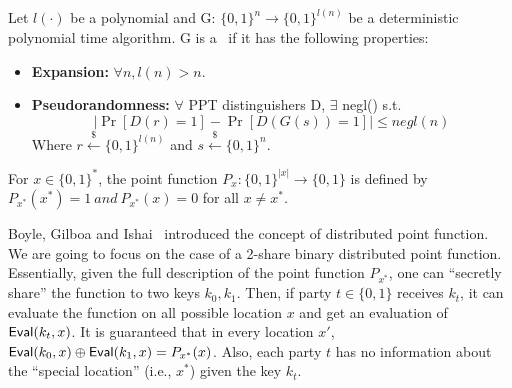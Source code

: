 \begin{definition}[PRG]
    Let $l(\cdot)$ be a polynomial and G: $ \{0,1\}^n \rightarrow \{0,1\}^{l(n)}$ be a deterministic
    polynomial time algorithm. G is a \Prg \ if it has the following properties:
    \hfill
    \begin{itemize}
        \item \textbf{Expansion:} $\forall n, l(n) > n$.
        \item \textbf{Pseudorandomness:} $\forall$ PPT distinguishers D, $\exists$ negl() s.t.
        $$\left|\Pr[D(r) = 1] - \Pr[D(G(s)) = 1]\right| \leq negl(n)$$ 
        Where $r \overset{{\scriptscriptstyle\$}}{\leftarrow} \{0,1\}^{l(n)}$ and
        $s \overset{{\scriptscriptstyle\$}}{\leftarrow} \{0,1\}^{n}$.
    \end{itemize}
\end{definition}


\begin{notation}
    For $x \in\{0,1\}^*$, the point function $P_{x}:\{0,1\}^{|{x}|} \rightarrow \{0,1\}$
    is defined by $P_{x^*}(x^*) = 1 \ and \ P_{x^*}(x) = 0$ for all $x \neq x^*$.
\end{notation}

Boyle, Gilboa and Ishai~\cite{boyle2016function} introduced the concept of distributed point function. 
We are going to focus on the case of a 2-share binary distributed point function. 
Essentially, given the full description of the point function $P_{x^*}$, one can ``secretly share'' the function to two keys $k_0,k_1$. Then, if party $t\in\{0,1\}$ receives $k_t$, it can evaluate the function on all possible location $x$ and get an evaluation of ${\sf Eval}(k_t, x)$. 
It is guaranteed that in every location $x'$, ${\sf Eval}(k_0, x)\oplus{\sf Eval}(k_1, x)=P_{x^*}(x)$.
Also, each party $t$ has no information about the ``special location'' (i.e., $x^*$) given the key $k_t$.


